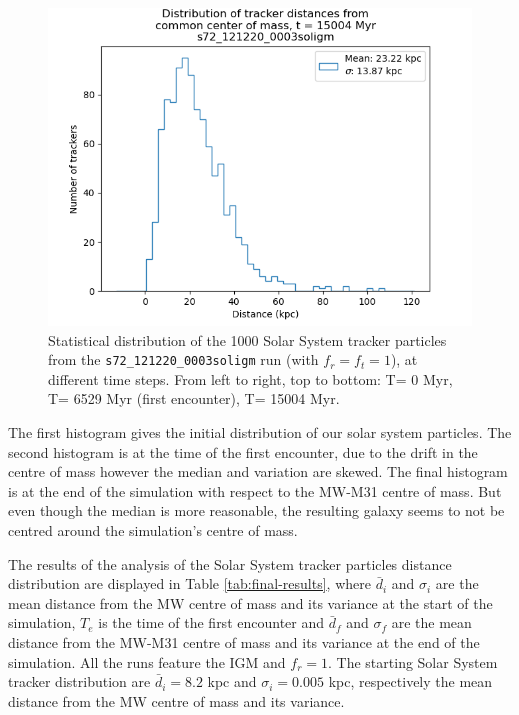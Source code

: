 \documentclass[a4paper,12pt, english]{article}
\begin{document}
\begin{figure}[!h]
\begin{minipage}{0.45\textwidth}
\includegraphics[width=1\textwidth]{Histogram/IGMvelfactor1/hist_common_com_-0001.png}
\end{minipage}
\caption{Statistical distribution of the 1000 Solar System tracker particles from the \texttt{s72\_121220\_0003soligm} run (with \(f_r = f_t = 1\)), at different time steps. From left to right, top to bottom: T= 0 Myr, T= 6529 Myr (first encounter), T= 15004 Myr.}
\label{fig:IGM-Hist-x}
\end{figure}
\smallskip
The first histogram gives the initial distribution of our solar system particles. The second histogram is at the time of the first encounter, due to the drift in the centre of mass however the median and variation are skewed. The final histogram is at the end of the simulation with respect to the MW-M31 centre of mass. But even though the median is more reasonable, the resulting galaxy seems to not be centred around the simulation's centre of mass.\par
\smallskip
The results of the analysis of the Solar System tracker particles distance distribution are displayed in Table \ref{tab:final-results}, where \(\bar{d}_i\) and \(\sigma_i\) are the mean distance from the MW centre of mass and its variance at the start of the simulation, \(T_e\) is the time of the first encounter and \(\bar{d}_f\) and \(\sigma_f\) are the mean distance from the MW-M31 centre of mass and its variance at the end of the simulation. All the runs feature the IGM and \(f_r = 1\). The starting Solar System tracker distribution are \(\bar{d}_i = 8.2\) kpc and \(\sigma_i = 0.005\) kpc, respectively the mean distance from the MW centre of mass and its variance.\par
\end{document}
